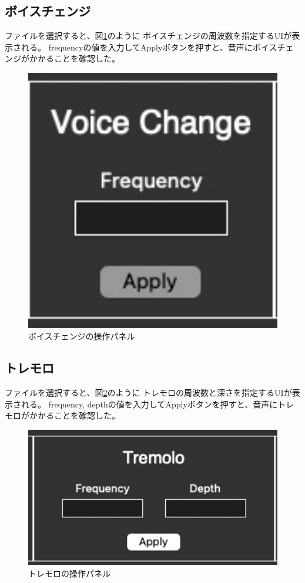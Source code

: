 \documentclass[a4paper,11pt]{jsarticle}
\begin{document}
\subsection{ボイスチェンジ}
ファイルを選択すると、図\ref{fig:voice_change}のように
ボイスチェンジの周波数を指定するUIが表示される。
frequencyの値を入力してApplyボタンを押すと、音声にボイスチェンジがかかることを確認した。

\begin{figure}[h]
\centering
\includegraphics[keepaspectratio, width=13cm]
{./images/voice_change.jpg}
\caption{ボイスチェンジの操作パネル}
\label{fig:voice_change}
\end{figure}

\subsection{トレモロ}
ファイルを選択すると、図\ref{fig:tremolo}のように
トレモロの周波数と深さを指定するUIが表示される。
frequency, depthの値を入力してApplyボタンを押すと、音声にトレモロがかかることを確認した。

\begin{figure}[h]
\centering
\includegraphics[keepaspectratio, width=13cm]
{./images/tremolo.jpg}
\caption{トレモロの操作パネル}
\label{fig:tremolo}
\end{figure}
\end{document}
